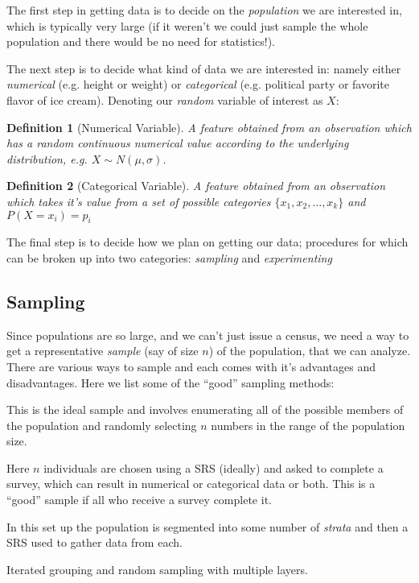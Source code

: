\documentclass{article}
\newtheorem{mydef}{Definition}
\begin{document}
The first step in getting data is to decide on the \textit{population} we are interested in, which is typically very large (if it weren't we could just sample the whole population and there would be no need for statistics!). 

The next step is to decide what kind of data we are interested in: namely either \textit{numerical} (e.g. height or weight) or \textit{categorical} (e.g. political party or favorite flavor of ice cream). Denoting our \textit{random} variable of interest as $X$: 

\begin{mydef}[Numerical Variable] 
A feature obtained from an observation which has a random continuous numerical value according to the underlying distribution, e.g. $X \sim N(\mu, \sigma)$.
\end{mydef}

\begin{mydef}[Categorical Variable] 
A feature obtained from an observation which takes it's value from a set of possible categories $\{x_1, x_2, \dots , x_k\}$ and $P(X = x_i) = p_i$
\end{mydef}

The final step is to decide how we plan on getting our data; procedures for which can be broken up into two categories: \textit{sampling} and \textit{experimenting} 

\subsection{Sampling}

Since populations are so large, and we can't just issue a census, we need a way to get a representative \textit{sample} (say of size $n$) of the population, that we can analyze.  There are various ways to sample and each comes with it's advantages and disadvantages. Here we list some of the ``good'' sampling methods:

\begin{description}[style=nextline]
\item [Simple Random Sample (SRS)] This is the ideal sample and involves enumerating all of the possible members of the population and randomly selecting $n$ numbers in the range of the population size.

\item [Survey Sample] Here $n$ individuals are chosen using a SRS (ideally) and asked to complete a survey, which can result in numerical or categorical data or both. This is a ``good'' sample if all who receive a survey complete it.

\item [Stratified Random Sample] In this set up the population is segmented into some number of \textit{strata} and then a SRS used to gather data from each.
    
\item [Multistage Sample] Iterated grouping and random sampling with multiple layers.

\end{description}
\end{document}
